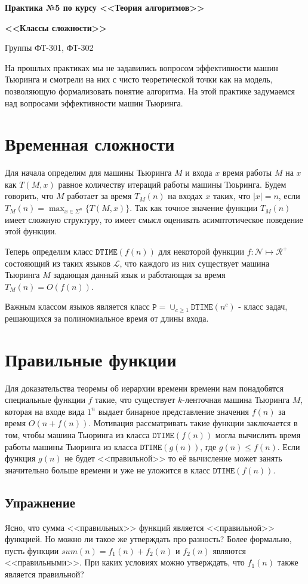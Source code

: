 \documentclass[
    11pt,
    a4paper
]{article}
\theoremstyle{definition}
\begin{document}
\centerline{\Large \bf Практика №5 по курсу <<Теория алгоритмов>>}
\centerline{\Large \bf <<Классы сложности>>}
\centerline{Группы ФТ-301, ФТ-302}

На прошлых практиках мы не задавились вопросом эффективности машин Тьюринга и смотрели на них с чисто теоретической точки как на модель, позволяющую формализовать понятие алгоритма. На этой практике задумаемся над вопросами эффективности машин Тьюринга. 

\section{Временная сложности}

Для начала определим для машины Тьюринга $M$ и входа $x$ время работы $M$ на $x$ как $T(M, x)$ равное количеству итераций работы машины Тюьринга. Будем говорить, что $M$ работает за время $T_M(n)$ на входах $x$ таких, что $|x| = n$, если $T_M(n) = \max_{x \in \Sigma^n}\{T(M, x)\}$. Так как точное значение функции $T_M(n)$ имеет сложную структуру, то имеет смысл оценивать асимптотическое поведение этой функции.

Теперь определим класс $\texttt{DTIME}(f(n))$ для некоторой функции $f: \mathcal{N} \mapsto \mathcal{R}^+$ состояющий из таких языков $\mathcal{L}$, что каждого из них существует машина Тьюринга $M$ задающая данный язык и работающая за время $T_M(n) = O(f(n))$. 

Важным классом языков является класс $\mathtt{P} = \cup_{c \geq 1} \texttt{DTIME}(n^c)$ - класс задач, решающихся за полиномиальное время от длины входа.

\section{Правильные функции}

Для доказательства теоремы об иерархии времени времени нам понадобятся специальные функции $f$ такие, что существует $k$-ленточная машина Тьюринга $M$, которая на входе вида $1^n$ выдает бинарное представление значения $f(n)$ за время $O(n + f(n))$. Мотивация рассматривать такие функции заключается в том, чтобы машина Тьюринга из класса $\texttt{DTIME}(f(n))$ могла вычислить время работы машины Тьюринга из класса $\texttt{DTIME}(g(n))$, где $g(n) \leq f(n)$. Если функция $g(n)$ не будет <<правильной>> то её вычисление может занять значительно больше времени и уже не уложится в класс $\texttt{DTIME}(f(n))$.

\subsection{Упражнение}
Ясно, что сумма <<правильных>> функций является <<правильной>> функцией. Но можно ли такое же утверждать про разность? Более формально, пусть функции $sum(n) = f_1(n) + f_2(n)$ и $f_2(n)$ являются <<правильными>>. При каких условиях можно утверждать, что $f_1(n)$ также является правильной?
\end{document}
